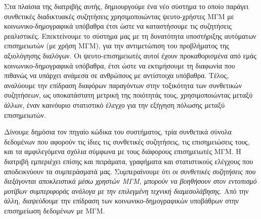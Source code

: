 Στα πλαίσια της διατριβής αυτής, δημιουργούμε ένα νέο σύστημα το οποίο παράγει συνθετικές διαδικτυακές συζητήσεις χρησιμοποιώντας ψευτο-χρήστες ΜΓΜ με κοινωνικο-δημογραφικά υπόβαθρα έτσι ώστε να καταστήσουμε τις συζητήσεις ρεαλιστικές. Επεκτείνουμε το σύστημα μας με τη δυνατότητα υποστήριξης αυτόματων επισημειωτών (με χρήση ΜΓΜ), για την αντιμετώπιση του προβλήματος της αξιολόγησης διαλόγων. Οι ψευτο-επισημειωτές αυτοί έχουν προκαθορισμένα από εμάς κοινωνικο-δημογραφικά υπόβαθρα, έτσι ώστε να εκτιμήσουμε τη διαφωνία που πιθανώς να υπάρχει ανάμεσα σε ανθρώπους με αντίστοιχα υπόβαθρα. Τέλος, αναλύουμε την επίδραση διαφόρων παραγόντων στην τοξικότητα των συνθετικών συζητήσεων, ως υποκατάστατη μετρική της ποιότητάς τους, χρησιμοποιώντας μεταξύ άλλων, έναν καινόυριο στατιστικό έλεγχο για την εξήγηση πόλωσης μεταξύ επισημειωτών. 

Δίνουμε δημόσια τον πηγαίο κώδικα του συστήματος, τρία συνθετικά σύνολα δεδομένων που αφορούν τις ίδιες τις συνθετικές συζητήσεις, τις επισημειώσεις τους, και τα αμφιλεγόμενα σχόλια σύμφωνα με τους διάφορους επισημειωτές ΜΓΜ. Η διατριβή εμπεριέχει επίσης και πειράματα, γραφήματα και στατιστικούς ελέγχους που αποδεικνύουν τα συμπεράσματά μας. Συμπεραίνουμε ότι \textit{οι συνθετικές συζητήσεις που διεξάγονται αποκλειστικά μέσω χρηστών ΜΓΜ, μπορούν να βοηθήσουν στον εντοπισμό μοτίβων συμπεριφοράς ανάλογα με την επιλεγμένη τεχνική διαμεσολάβησης}. Από την άλλη, \textit{διαψεύδουμε} την επίδραση των κοινωνικο-δημογραφικών υποβάθρων στην επισημείωση δεδομένων με ΜΓΜ.

